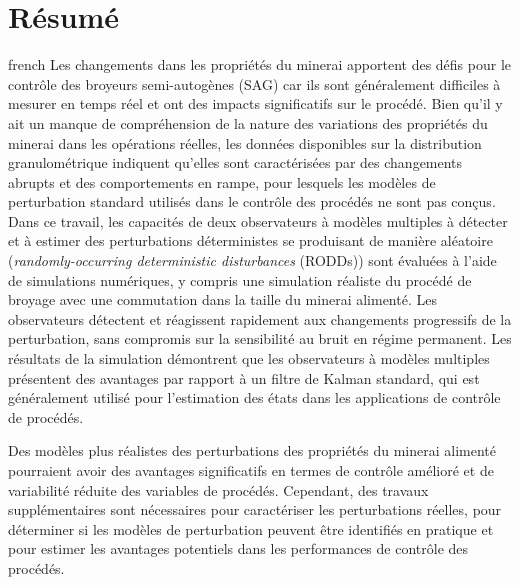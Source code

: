 \chapter*{Résumé}               %
\label{chap-resume}             %

\begin{otherlanguage*}{french}
Les changements dans les propriétés du minerai apportent des défis pour le contrôle des broyeurs semi-autogènes (SAG) car ils sont généralement difficiles à mesurer en temps réel et ont des impacts significatifs sur le procédé. Bien qu'il y ait un manque de compréhension de la nature des variations des propriétés du minerai dans les opérations réelles, les données disponibles sur la distribution granulométrique indiquent qu'elles sont caractérisées par des changements abrupts et des comportements en rampe, pour lesquels les modèles de perturbation standard utilisés dans le contrôle des procédés ne sont pas conçus. Dans ce travail, les capacités de deux observateurs à modèles multiples à détecter et à estimer des perturbations déterministes se produisant de manière aléatoire (\textit{randomly-occurring deterministic disturbances} (\gls{RODD}s)) sont évaluées à l'aide de simulations numériques, y compris une simulation réaliste du procédé de broyage avec une commutation dans la taille du minerai alimenté. Les observateurs détectent et réagissent rapidement aux changements progressifs de la perturbation, sans compromis sur la sensibilité au bruit en régime permanent. Les résultats de la simulation démontrent que les observateurs à modèles multiples présentent des avantages par rapport à un filtre de Kalman standard, qui est généralement utilisé pour l'estimation des états dans les applications de contrôle de procédés.

Des modèles plus réalistes des perturbations des propriétés du minerai alimenté pourraient avoir des avantages significatifs en termes de contrôle amélioré et de variabilité réduite des variables de procédés. Cependant, des travaux supplémentaires sont nécessaires pour caractériser les perturbations réelles, pour déterminer si les modèles de perturbation peuvent être identifiés en pratique et pour estimer les avantages potentiels dans les performances de contrôle des procédés.
	

\end{otherlanguage*}
